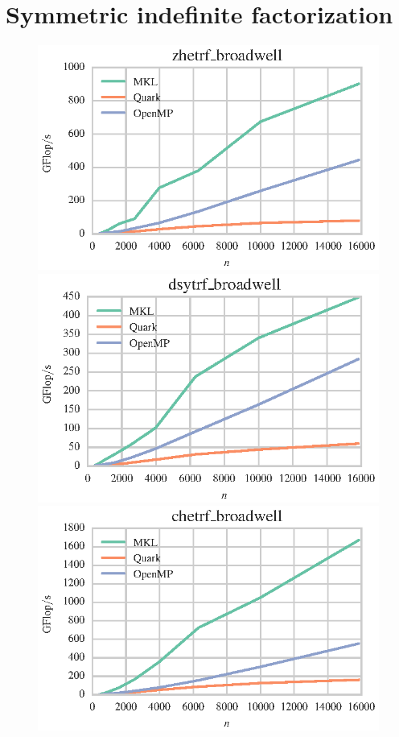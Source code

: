 \documentclass[a4paper,12pt]{article}
\begin{document}
\section{Symmetric indefinite factorization}
\label{sec.ldlt}
\begin{figure}[t]
  \centering
  \includegraphics[scale=.85]{fig/kebnekaise_zhetrf_weak_scaling.eps}
  \includegraphics[scale=.85]{fig/kebnekaise_dsytrf_weak_scaling.eps}
  \includegraphics[scale=.85]{fig/kebnekaise_chetrf_weak_scaling.eps}

\end{figure}
\end{document}
